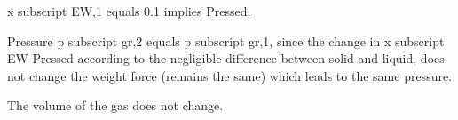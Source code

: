 x subscript EW,1 equals 0.1 implies Pressed.

Pressure p subscript gr,2 equals p subscript gr,1, since the change in x subscript EW Pressed according to the negligible difference between solid and liquid, does not change the weight force (remains the same) which leads to the same pressure.

The volume of the gas does not change.
